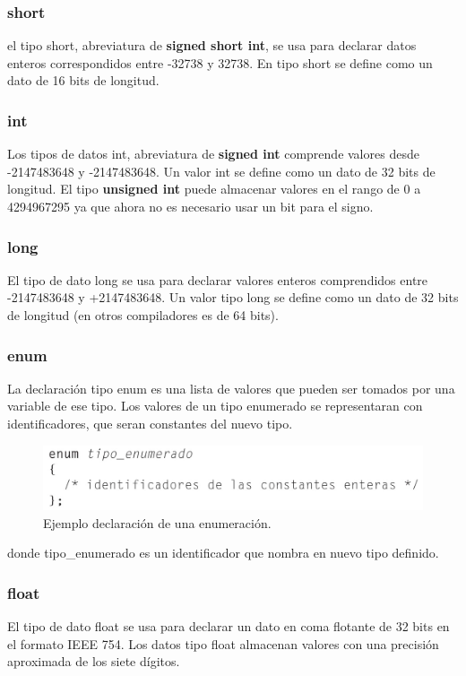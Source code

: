 \documentclass[]{article}
\begin{document}
\subsubsection{short}
el tipo short, abreviatura de \textbf{signed short int}, se usa para declarar datos enteros correspondidos entre -32738 y 32738. En tipo short se define como un dato de 16 bits de longitud.

\subsubsection{int}
Los tipos de datos int, abreviatura de \textbf{signed int} comprende valores desde -2147483648 y -2147483648. Un valor int se define como un dato de 32 bits de longitud.
El tipo \textbf{unsigned int} puede almacenar valores en el rango de 0 a 4294967295 ya que ahora no es necesario usar un bit para el signo.

\subsubsection{long}
El tipo de dato long se usa para declarar valores enteros comprendidos entre -2147483648 y +2147483648. Un valor tipo long se define como un dato de 32 bits de longitud (en otros compiladores es de 64 bits).

\subsubsection{enum}
La declaración tipo enum es una lista de valores que pueden ser tomados por una variable de ese tipo. Los valores de un tipo enumerado se representaran con identificadores, que seran constantes del nuevo tipo.
\begin{figure}[h!]
	\centering
	\includegraphics[width=0.7\linewidth]{"img/enum"}
	\caption{Ejemplo declaración de una enumeración.}
	\label{fig:proceso-de-compilacion}
\end{figure}

donde tipo\_enumerado es un identificador que nombra en nuevo tipo definido.

\subsubsection{float}
El tipo de dato float se usa para declarar un dato en coma flotante de 32 bits en el formato IEEE 754. Los datos tipo float almacenan valores con una precisión aproximada de los siete dígitos.
\end{document}
